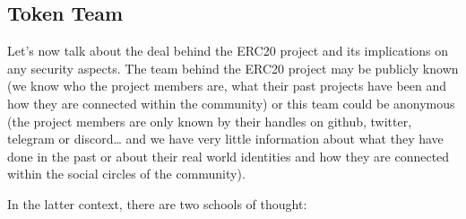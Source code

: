 \subsection{Token Team}\label{token-team}

Let's now talk about the deal behind the ERC20 project and its
implications on any security aspects. The team behind the ERC20 project
may be publicly known (we know who the project members are, what their
past projects have been and how they are connected within the community)
or this team could be anonymous (the project members are only known by
their handles on github, twitter, telegram or discord\ldots{} and we
have very little information about what they have done in the past or
about their real world identities and how they are connected within the
social circles of the community).

In the latter context, there are two schools of thought:

